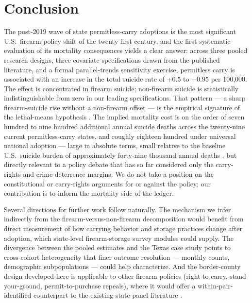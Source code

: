 \documentclass[12pt]{article}
\begin{document}
\section{Conclusion}\label{sec:conclusion}

The post-2019 wave of state permitless-carry adoptions is the most
significant U.S.\ firearm-policy shift of the twenty-first century,
and the first systematic evaluation of its mortality consequences
yields a clear answer: across three pooled research designs, three
covariate specifications drawn from the published literature, and
a formal parallel-trends sensitivity exercise, permitless carry is
associated with an increase in the total suicide rate of $+0.5$ to
$+0.95$ per 100,000. The effect is concentrated in firearm suicide;
non-firearm suicide is statistically indistinguishable from zero in
our leading specifications. That pattern --- a sharp firearm-suicide
rise without a non-firearm offset --- is the empirical signature
of the lethal-means hypothesis \citep{millerhemenway1999,
miller2002a, kivisto2018, crifasi2015}. The implied mortality cost
is on the order of seven hundred to nine hundred additional annual
suicide deaths across the twenty-nine current permitless-carry
states, and roughly eighteen hundred under universal national
adoption --- large in absolute terms, small relative to the baseline
U.S.\ suicide burden of approximately forty-nine thousand annual
deaths \citep{cdcwonder}, but directly relevant to a policy debate
that has so far considered only the carry-rights and crime-deterrence
margins. We do not take a position on the constitutional or
carry-rights arguments for or against the policy; our contribution
is to inform the mortality side of the ledger.

Several directions for further work follow naturally. The
mechanism we infer indirectly from the firearm-versus-non-firearm
decomposition would benefit from direct measurement of how
carrying behavior and storage practices change after adoption,
which state-level firearm-storage survey modules could supply.
The divergence between the pooled estimates and the Texas case
study points to cross-cohort heterogeneity that finer outcome
resolution --- monthly counts, demographic subpopulations --- could
help characterize. And the border-county design developed here is
applicable to other firearm policies (right-to-carry,
stand-your-ground, permit-to-purchase repeals), where it would
offer a within-pair-identified counterpart to the existing
state-panel literature \citep{donohue2019, cheng2013, mccourt2020}.
\end{document}
